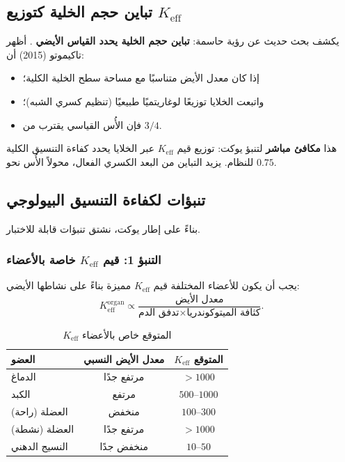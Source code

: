 \documentclass[11pt,a4paper]{article}
\newcommand{\Keff}{K_{\mathrm{eff}}}
\begin{document}
	\subsection{تباين حجم الخلية كتوزيع \(\Keff\)}
	
	يكشف بحث حديث عن رؤية حاسمة: \textbf{تباين حجم الخلية يحدد القياس الأيضي} \cite{Takemoto2015}. أظهر تاكيموتو (2015) أن:
	\begin{itemize}
		\item إذا كان معدل الأيض متناسبًا مع مساحة سطح الخلية الكلية؛
		\item واتبعت الخلايا توزيعًا لوغاريتميًا طبيعيًا (تنظيم كسري الشبه)؛
		\item فإن الأُس القياسي يقترب من \(3/4\).
	\end{itemize}
	هذا \textbf{مكافئ مباشر} لتنبؤ يوكت: توزيع قيم \(\Keff\) عبر الخلايا يحدد كفاءة التنسيق الكلية للنظام. يزيد التباين من البعد الكسري الفعال، محولاً الأُس نحو \(0.75\).
	
	\subsection{تنبؤات لكفاءة التنسيق البيولوجي}
	
	بناءً على إطار يوكت، نشتق تنبؤات قابلة للاختبار.
	
	\subsubsection{التنبؤ 1: قيم \(\Keff\) خاصة بالأعضاء}
	
	يجب أن يكون للأعضاء المختلفة قيم \(\Keff\) مميزة بناءً على نشاطها الأيضي:
	\begin{equation}
		\Keff^{\text{organ}} \propto \frac{\text{معدل الأيض}}{\text{تدفق الدم} \times \text{كثافة الميتوكوندريا}}.
	\end{equation}
	
	\begin{table}[htbp]
		\centering
		\caption{\(K_{\mathrm{eff}}\) المتوقع خاص بالأعضاء}
		\label{tab:organ-keff}
		\begin{tabular}{lcc}
			\toprule
			\textbf{العضو} & \textbf{معدل الأيض النسبي} & \textbf{\(K_{\mathrm{eff}}\) المتوقع} \\
			\midrule
			الدماغ & مرتفع جدًا & \(>1000\) \\
			الكبد & مرتفع & \(500\)–\(1000\) \\
			العضلة (راحة) & منخفض & \(100\)–\(300\) \\
			العضلة (نشطة) & مرتفع جدًا & \(>1000\) \\
			النسيج الدهني & منخفض جدًا & \(10\)–\(50\) \\
			\bottomrule
		\end{tabular}
	\end{table}
	
\end{document}
